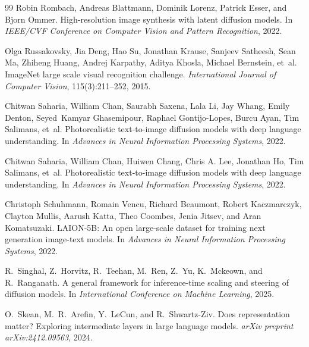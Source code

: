 \documentclass{article}
\begin{document}
\begin{thebibliography}{99}
Robin Rombach, Andreas Blattmann, Dominik Lorenz, Patrick Esser, and Bjorn Ommer.
\newblock High-resolution image synthesis with latent diffusion models.
\newblock In \emph{IEEE/CVF Conference on Computer Vision and Pattern Recognition}, 2022.

Olga Russakovsky, Jia Deng, Hao Su, Jonathan Krause, Sanjeev Satheesh, Sean Ma, Zhiheng Huang, Andrej Karpathy, Aditya Khosla, Michael Bernstein, et~al.
\newblock ImageNet large scale visual recognition challenge.
\newblock \emph{International Journal of Computer Vision}, 115(3):211--252, 2015.

Chitwan Saharia, William Chan, Saurabh Saxena, Lala Li, Jay Whang, Emily Denton, Seyed~Kamyar Ghasemipour, Raphael Gontijo-Lopes, Burcu Ayan, Tim Salimans, et~al.
\newblock Photorealistic text-to-image diffusion models with deep language understanding.
\newblock In \emph{Advances in Neural Information Processing Systems}, 2022.

Chitwan Saharia, William Chan, Huiwen Chang, Chris A. Lee, Jonathan Ho, Tim Salimans, et~al.
\newblock Photorealistic text-to-image diffusion models with deep language understanding.
\newblock In \emph{Advances in Neural Information Processing Systems}, 2022.

Christoph Schuhmann, Romain Vencu, Richard Beaumont, Robert Kaczmarczyk, Clayton Mullis, Aarush Katta, Theo Coombes, Jenia Jitsev, and Aran Komatsuzaki.
\newblock LAION-5B: An open large-scale dataset for training next generation image-text models.
\newblock In \emph{Advances in Neural Information Processing Systems}, 2022.

R.~Singhal, Z.~Horvitz, R.~Teehan, M.~Ren, Z.~Yu, K.~Mckeown, and R.~Ranganath.
\newblock A general framework for inference-time scaling and steering of diffusion models.
\newblock In \emph{International Conference on Machine Learning}, 2025.

O.~Skean, M.~R.~Arefin, Y.~LeCun, and R.~Shwartz-Ziv.
\newblock Does representation matter? Exploring intermediate layers in large language models.
\newblock \emph{arXiv preprint arXiv:2412.09563}, 2024.


\end{thebibliography}
\end{document}
